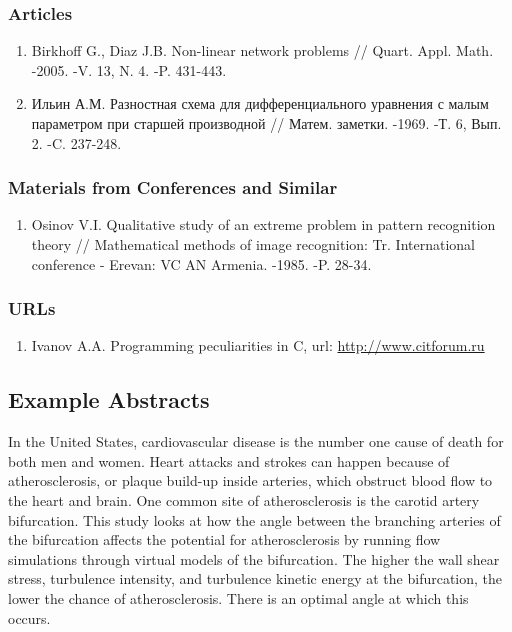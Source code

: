 \documentclass[a4paper, 12pt]{article}
\begin{document}
\subsubsection*{Articles}

\begin{enumerate}
    \item Birkhoff G., Diaz J.B. Non-linear network problems // Quart. Appl. 
        Math. -2005. -V. 13, N. 4. -P. 431-443.
    \item Ильин А.М. Разностная схема для дифференциального уравнения с малым 
    параметром при старшей производной // Матем. заметки. -1969. -Т. 6, Вып. 2. 
    -C. 237-248.
\end{enumerate}

\subsubsection*{Materials from Conferences and Similar}

\begin{enumerate}
    \item Osinov V.I. Qualitative study of an extreme problem in pattern 
        recognition theory // Mathematical methods of image recognition: Tr. 
        International conference - Erevan: VC AN Armenia. -1985. -P. 28-34.
\end{enumerate}

\subsubsection*{URLs}

\begin{enumerate}
    \item Ivanov A.A. Programming peculiarities in C, url: 
        \url{http://www.citforum.ru}
\end{enumerate}



\subsection*{Example Abstracts}

In the United States, cardiovascular disease is the number one cause of death 
for both men and women. Heart attacks and strokes can happen because of 
atherosclerosis, or plaque build-up inside arteries, which obstruct blood 
flow to the heart and brain. One common site of atherosclerosis is the carotid
artery bifurcation. This study looks at how the angle between the branching 
arteries of the bifurcation affects the potential for atherosclerosis by 
running flow simulations through virtual models of the bifurcation. The higher
the wall shear stress, turbulence intensity, and turbulence kinetic energy
at the bifurcation, the lower the chance of atherosclerosis. There is an 
optimal angle at which this occurs.\\
\end{document}
